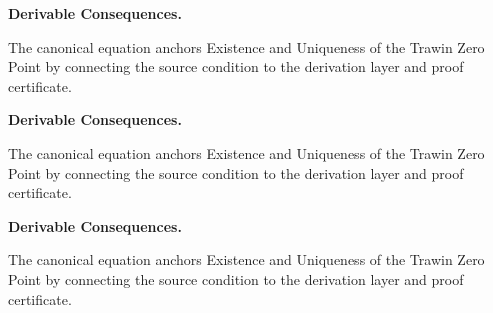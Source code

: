 \begin{minipage}[t]{0.49\linewidth}
\begin{minipage}[t]{0.49\linewidth}
\begin{minipage}[t]{0.49\linewidth}
\begin{minipage}[t]{0.49\linewidth}
\begin{minipage}[t]{0.49\linewidth}
\begin{minipage}[t]{0.49\linewidth}
\begin{minipage}[t]{0.49\linewidth}
\begin{minipage}[t]{0.49\linewidth}
\begin{minipage}[t]{0.49\linewidth}
\begin{minipage}[t]{0.49\linewidth}
\begin{minipage}[t]{0.49\linewidth}
\begin{minipage}[t]{0.49\linewidth}
\begin{minipage}[t]{0.49\linewidth}
\begin{minipage}[t]{0.49\linewidth}
\begin{minipage}[t]{0.49\linewidth}
\begin{minipage}[t]{0.49\linewidth}
\begin{minipage}[t]{0.49\linewidth}
\begin{minipage}[t]{0.49\linewidth}
\begin{minipage}[t]{0.49\linewidth}
\begin{minipage}[t]{0.49\linewidth}
\begin{minipage}[t]{0.49\linewidth}
\begin{minipage}[t]{0.49\linewidth}
\begin{minipage}[t]{0.49\linewidth}
\begin{minipage}[t]{0.49\linewidth}
\begin{minipage}[t]{0.49\linewidth}
\begin{minipage}[t]{0.49\linewidth}
\begin{minipage}[t]{0.49\linewidth}
\begin{minipage}[t]{0.49\linewidth}
\begin{minipage}[t]{0.49\linewidth}
\begin{minipage}[t]{0.49\linewidth}
\begin{minipage}[t]{0.49\linewidth}
\begin{minipage}[t]{0.49\linewidth}
\par\vspace{0.35em}
\noindent\textbf{Derivable Consequences.}\quad
\begingroup
\footnotesize
\raggedright
The canonical equation anchors Existence and Uniqueness of the Trawin Zero Point by connecting the source condition to the derivation layer and proof certificate.
\par\endgroup

\par\vspace{0.35em}
\noindent\textbf{Derivable Consequences.}\quad
\begingroup
\footnotesize
\raggedright
The canonical equation anchors Existence and Uniqueness of the Trawin Zero Point by connecting the source condition to the derivation layer and proof certificate.
\par\endgroup

\par\vspace{0.35em}
\noindent\textbf{Derivable Consequences.}\quad
\begingroup
\footnotesize
\raggedright
The canonical equation anchors Existence and Uniqueness of the Trawin Zero Point by connecting the source condition to the derivation layer and proof certificate.
\par\endgroup


\end{minipage}
\end{minipage}
\end{minipage}
\end{minipage}
\end{minipage}
\end{minipage}
\end{minipage}
\end{minipage}
\end{minipage}
\end{minipage}
\end{minipage}
\end{minipage}
\end{minipage}
\end{minipage}
\end{minipage}
\end{minipage}
\end{minipage}
\end{minipage}
\end{minipage}
\end{minipage}
\end{minipage}
\end{minipage}
\end{minipage}
\end{minipage}
\end{minipage}
\end{minipage}
\end{minipage}
\end{minipage}
\end{minipage}
\end{minipage}
\end{minipage}
\end{minipage}
